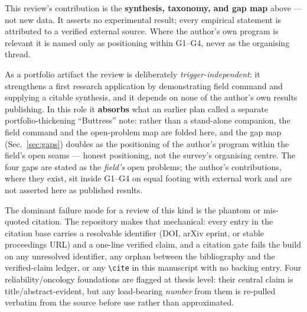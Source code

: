 \documentclass{iopjournal}
\begin{document}
This review's contribution is the \textbf{synthesis, taxonomy, and gap map} above --- not
new data. It asserts no experimental result; every empirical statement is attributed to a
verified external source. Where the author's own program is relevant it is named only as
positioning within G1--G4, never as the organising thread.

As a portfolio artifact the review is deliberately \emph{trigger-independent}: it
strengthens a first research application by demonstrating field command and supplying a
citable synthesis, and it depends on none of the author's own results publishing. In this
role it \textbf{absorbs} what an earlier plan called a separate portfolio-thickening
``Buttress'' note: rather than a stand-alone companion, the field command and the
open-problem map are folded here, and the gap map (Sec.~\ref{sec:gaps}) doubles as the
positioning of the author's program within the field's open seams --- honest positioning,
not the survey's organising centre. The four gaps are stated as the \emph{field's} open
problems; the author's contributions, where they exist, sit inside G1--G4 on equal
footing with external work and are not asserted here as published results.

The dominant failure mode for a review of this kind is the phantom or mis-quoted citation.
The repository makes that mechanical: every entry in the citation base carries a resolvable
identifier (DOI, arXiv eprint, or stable proceedings URL) and a one-line verified claim,
and a citation gate fails the build on any unresolved identifier, any orphan between the
bibliography and the verified-claim ledger, or any \verb|\cite| in this manuscript with no
backing entry. Four reliability/oncology foundations are flagged at thesis level: their
central claim is title/abstract-evident, but any load-bearing \emph{number} from them is
re-pulled verbatim from the source before use rather than approximated.


\end{document}
